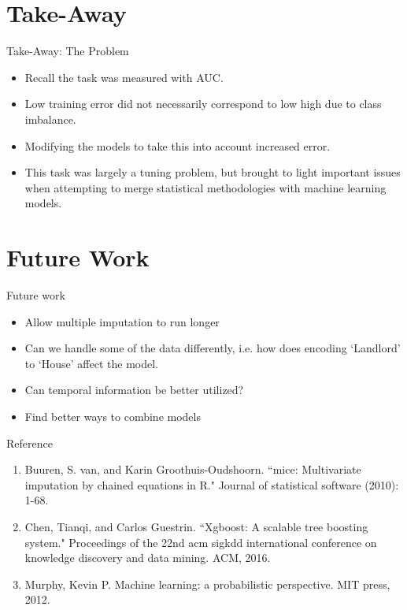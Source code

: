\documentclass{beamer}
\newcounter{saveenumi}
\newcommand{\seti}{\setcounter{saveenumi}{\value{enumi}}}
\newcommand{\conti}{\setcounter{enumi}{\value{saveenumi}}}
\begin{document}
\section{Take-Away}
\begin{frame}{Take-Away: The Problem}
\begin{itemize}
	\item Recall the task was measured with AUC.
	\item Low training error did not necessarily correspond to low high due to class imbalance.
	\item Modifying the models to take this into account increased error.
	\item This task was largely a tuning problem, but brought to light important issues when attempting to merge statistical methodologies with machine learning models.
\end{itemize}
\end{frame}

\section{Future Work}
\begin{frame}{Future work}
\begin{itemize}
	\item Allow multiple imputation to run longer
	\item Can we handle some of the data differently, i.e. how does encoding `Landlord' to `House' affect the model.
	\item Can temporal information be better utilized?
	\item Find better ways to combine models
\end{itemize}
\end{frame}

\begin{frame}{Reference}
\begin{enumerate}
\conti
\item Buuren, S. van, and Karin Groothuis-Oudshoorn. ``mice: Multivariate imputation by chained equations in R." Journal of statistical software (2010): 1-68.
\item Chen, Tianqi, and Carlos Guestrin. ``Xgboost: A scalable tree boosting system." Proceedings of the 22nd acm sigkdd international conference on knowledge discovery and data mining. ACM, 2016.
\item Murphy, Kevin P. Machine learning: a probabilistic perspective. MIT press, 2012.

\seti
\end{enumerate}
\end{frame}
\end{document}
